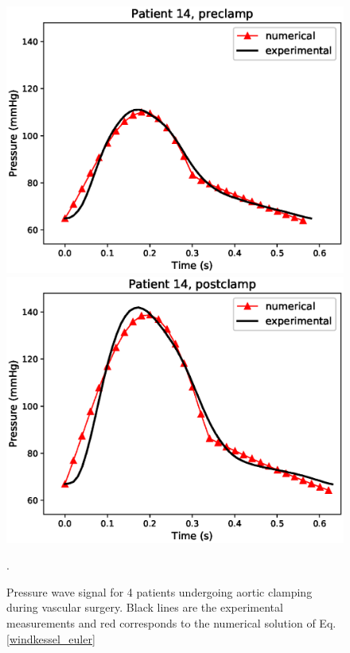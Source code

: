 \documentclass{config}
\begin{document}
\begin{figure}[H]
\begin{minipage}{0.48\textwidth}
\includegraphics[scale=0.5]{Figures/14preclamp.eps}
\end{minipage}
\begin{minipage}{0.48\textwidth}
\includegraphics[scale=0.5]{Figures/14postclamp.eps}
\end{minipage}
\caption{Pressure wave signal for 4 patients undergoing aortic clamping during vascular surgery. Black lines are the experimental measurements and red corresponds to the numerical solution of Eq. \ref{windkessel_euler}}.
\label{res}
\end{figure}
\end{document}
